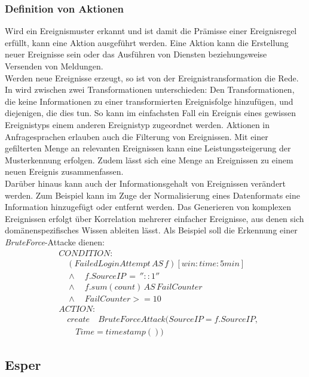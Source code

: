 \documentclass{acm_proc_article-sp}
\begin{document}
\subsubsection{Definition von Aktionen}
\vspace{0.1cm}
Wird ein Ereignismuster erkannt und ist damit die Prämisse einer Ereignisregel erfüllt, 
kann eine Aktion ausgeführt werden. Eine Aktion kann die Erstellung neuer Ereignisse 
sein oder das Ausführen von Diensten beziehungsweise Versenden von Meldungen.\\
Werden neue Ereignisse erzeugt, so ist von der Ereignistransformation die Rede. In 
\cite{bruns} wird zwischen zwei Transformationen unterschieden: Den Transformationen, die 
keine Informationen zu einer transformierten Ereignisfolge hinzufügen, und diejenigen, 
die 
dies tun. So kann im einfachsten Fall ein Ereignis eines gewissen Ereignistyps einem 
anderen Ereignistyp zugeordnet werden. Aktionen in Anfragesprachen erlauben auch die 
Filterung von Ereignissen. Mit einer gefilterten Menge an relevanten Ereignissen kann 
eine Leistungssteigerung der Musterkennung erfolgen. Zudem lässt sich eine Menge an 
Ereignissen zu einem neuen Ereignis zusammenfassen.\\
Darüber hinaus kann auch der Informationsgehalt von Ereignissen verändert werden. Zum 
Beispiel kann im Zuge der Normalisierung eines Datenformats eine Information hinzugefügt 
oder entfernt werden. Das Generieren von komplexen Ereignissen erfolgt über Korrelation 
mehrerer 
einfacher Ereignisse, aus denen sich domänenspezifisches Wissen ableiten lässt. Als 
Beispiel soll die Erkennung einer \textit{BruteForce}-Attacke dienen:
\begin{align*}
&CONDITION:\\
&\quad (FailedLoginAttempt\, AS\, f)[win:time:5min]\\
&\quad \land\quad f.SourceIP\, =\, ''::1'' \\
&\quad \land\quad f.sum(count)\, AS\, FailCounter\\
&\quad \land\quad FailCounter >= 10\\
&ACTION:\\
&\quad create \quad BruteForceAttack(SourceIP = f.SourceIP,\\
&\quad \quad Time=timestamp())
\end{align*}

%
%
\subsection{Esper}\label{kap:esper} 
\vspace{0.1cm}
\end{document}
